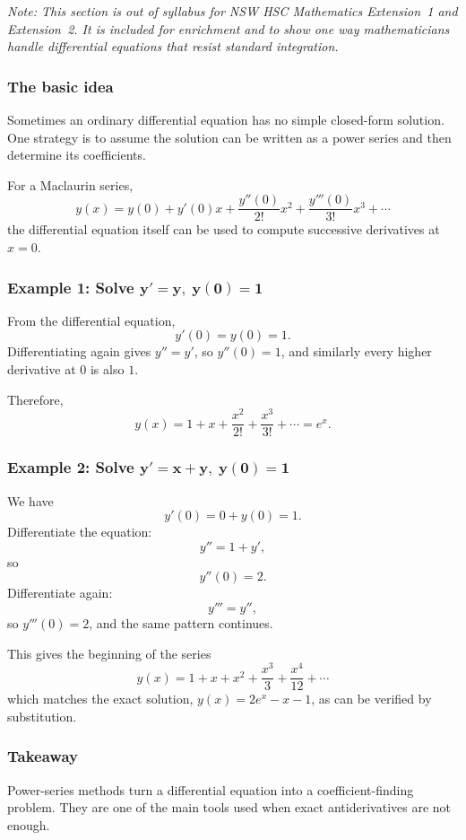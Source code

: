 \textit{Note: This section is out of syllabus for NSW HSC Mathematics Extension~1 and Extension~2. It is included for enrichment and to show one way mathematicians handle differential equations that resist standard integration.}

\subsubsection*{The basic idea}
Sometimes an ordinary differential equation has no simple closed-form solution. One strategy is to assume the solution can be written as a power series and then determine its coefficients.

For a Maclaurin series,
\[
y(x)=y(0)+y'(0)x+\frac{y''(0)}{2!}x^2+\frac{y'''(0)}{3!}x^3+\cdots
\]
the differential equation itself can be used to compute successive derivatives at $x=0$.

\subsubsection*{Example 1: Solve $\boldsymbol{y'=y,\; y(0)=1}$}
From the differential equation,
\[
y'(0)=y(0)=1.
\]
Differentiating again gives $y''=y'$, so $y''(0)=1$, and similarly every higher derivative at $0$ is also $1$.

Therefore,
\[
y(x)=1+x+\frac{x^2}{2!}+\frac{x^3}{3!}+\cdots=e^x.
\]

\subsubsection*{Example 2: Solve $\boldsymbol{y'=x+y,\; y(0)=1}$}
We have
\[
y'(0)=0+y(0)=1.
\]
Differentiate the equation:
\[
y''=1+y',
\]
so
\[
y''(0)=2.
\]
Differentiate again:
\[
y'''=y'',
\]
so $y'''(0)=2$, and the same pattern continues.

This gives the beginning of the series
\[
y(x)=1+x+x^2+\frac{x^3}{3}+\frac{x^4}{12}+\cdots
\]
which matches the exact solution, $y(x)=2e^x-x-1$, as can be verified by substitution.

\subsubsection*{Takeaway}
Power-series methods turn a differential equation into a coefficient-finding problem. They are one of the main tools used when exact antiderivatives are not enough.
